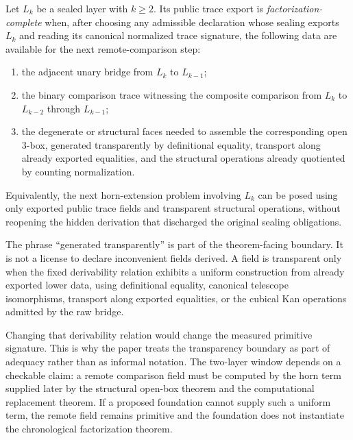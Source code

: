 \documentclass{lmcs}
\begin{document}
\begin{defi}
Let \(L_k\) be a sealed layer with \(k\geq 2\).  Its public trace export is
\emph{factorization-complete} when, after choosing any admissible declaration whose sealing
exports \(L_k\) and reading its canonical normalized trace signature, the following data are
available for the next remote-comparison step:
\begin{enumerate}
\item the adjacent unary bridge from \(L_k\) to \(L_{k-1}\);
\item the binary comparison trace witnessing the composite comparison from \(L_k\) to
\(L_{k-2}\) through \(L_{k-1}\);
\item the degenerate or structural faces needed to assemble the corresponding open
\(3\)-box, generated transparently by definitional equality, transport along already exported
equalities, and the structural operations already quotiented by counting normalization.
\end{enumerate}
Equivalently, the next horn-extension problem involving \(L_k\) can be posed using only
exported public trace fields and transparent structural operations, without reopening the
hidden derivation that discharged the original sealing obligations.
\end{defi}

\begin{rem}
The phrase ``generated transparently'' is part of the theorem-facing boundary.  It is not a
license to declare inconvenient fields derived.  A field is transparent only when the fixed
derivability relation exhibits a uniform construction from already exported lower data, using
definitional equality, canonical telescope isomorphisms, transport along exported equalities,
or the cubical Kan operations admitted by the raw bridge.

Changing that derivability relation would change the measured primitive signature.  This is
why the paper treats the transparency boundary as part of adequacy rather than as informal
notation.  The two-layer window depends on a checkable claim: a remote comparison field
must be computed by the horn term supplied later by the structural open-box theorem and the
computational replacement theorem.  If a proposed foundation cannot supply such a uniform
term, the remote field remains primitive and the foundation does not instantiate the
chronological factorization theorem.
\end{rem}
\end{document}
